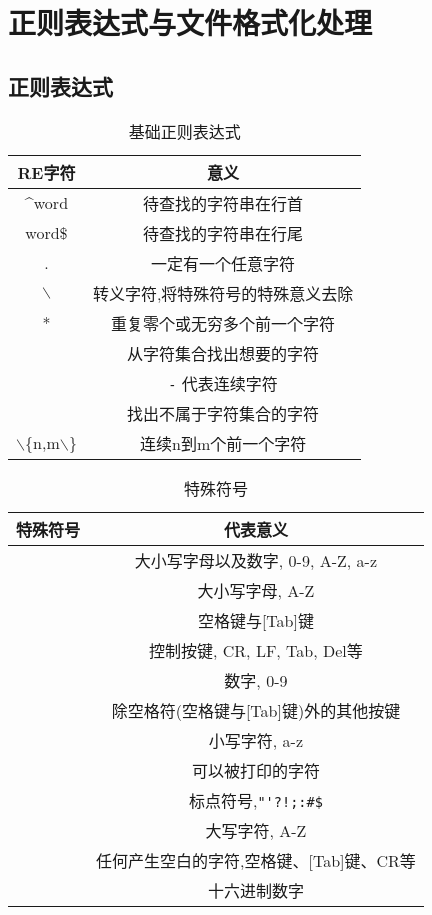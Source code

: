\section{正则表达式与文件格式化处理}
\setcounter{table}{0}

\subsection{正则表达式}
\begin{table}[h]
\centering
\renewcommand{\arraystretch}{1.3}
\begin{tabular}{c|c}
  \hline
  RE字符 & 意义 \\\hline
  $\^$word & 待查找的字符串在行首 \\\hline
   word\$ & 待查找的字符串在行尾  \\\hline
   .& 一定有一个任意字符 \\\hline
   $\backslash$ & 转义字符,将特殊符号的特殊意义去除 \\\hline
   * & 重复零个或无穷多个前一个字符 \\\hline
   [list] & 从字符集合找出想要的字符 \\\hline
   [n1-n2] & \texttt{-} 代表连续字符  \\\hline
   [ $\^$list] & 找出不属于字符集合的字符 \\\hline
   $\backslash$\{n,m$\backslash$\} & 连续n到m个前一个字符  \\\hline
\end{tabular}
\caption{基础正则表达式}
\end{table}


\begin{table}[h]
\centering
\renewcommand{\arraystretch}{1.3}
\begin{tabular}{c|c}
\hline
  特殊符号  & 代表意义 \\\hline
  [:alnum:] & 大小写字母以及数字, 0-9, A-Z, a-z \\\hline
  [:alpha:] & 大小写字母, A-Z \\\hline
  [:blank:] & 空格键与[Tab]键 \\\hline
  [:cntrl:] & 控制按键, CR, LF, Tab, Del等 \\\hline
  [:digit:] & 数字, 0-9 \\\hline
  [:graph:] & 除空格符(空格键与[Tab]键)外的其他按键 \\\hline
  [:lower:] & 小写字符, a-z \\\hline
  [:print:] & 可以被打印的字符 \\\hline
  [:punct:] & 标点符号,\verb|"'?!;:#$| \\\hline
  [:upper:] & 大写字符, A-Z \\\hline
  [:space:] & 任何产生空白的字符,空格键、[Tab]键、CR等 \\\hline
  [:xdigit:] & 十六进制数字 \\\hline
\end{tabular}
\caption{特殊符号}
\end{table}

